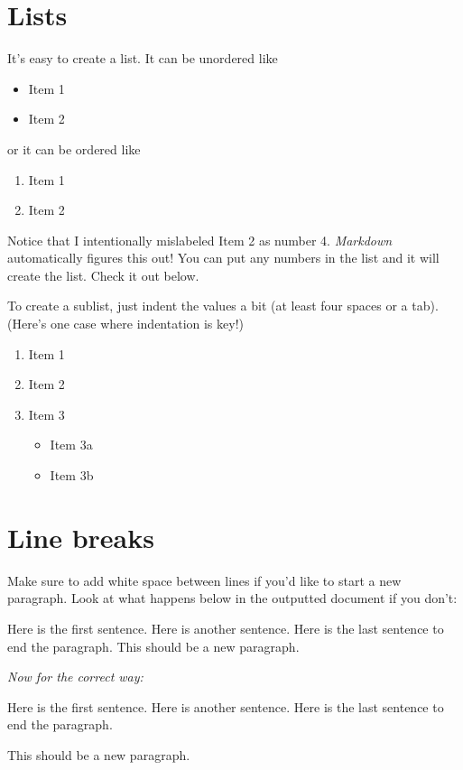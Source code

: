 \documentclass[12pt,twoside]{Mactemplate}
\providecommand{\tightlist}{%
  \setlength{\itemsep}{0pt}\setlength{\parskip}{0pt}}
\theoremstyle{definition}
\theoremstyle{definition}
\theoremstyle{definition}
\theoremstyle{remark}
\begin{document}
\section{Lists}\label{lists}

It's easy to create a list. It can be unordered like
\begin{itemize}
\tightlist
\item
  Item 1
\item
  Item 2
\end{itemize}
or it can be ordered like
\begin{enumerate}
\def\labelenumi{\arabic{enumi}.}
\tightlist
\item
  Item 1
\item
  Item 2
\end{enumerate}
Notice that I intentionally mislabeled Item 2 as number 4.
\emph{Markdown} automatically figures this out! You can put any numbers
in the list and it will create the list. Check it out below.

To create a sublist, just indent the values a bit (at least four spaces
or a tab). (Here's one case where indentation is key!)
\begin{enumerate}
\def\labelenumi{\arabic{enumi}.}
\tightlist
\item
  Item 1
\item
  Item 2
\item
  Item 3
  \begin{itemize}
  \tightlist
  \item
    Item 3a
  \item
    Item 3b
  \end{itemize}
\end{enumerate}
\section{Line breaks}\label{line-breaks}

Make sure to add white space between lines if you'd like to start a new
paragraph. Look at what happens below in the outputted document if you
don't:

Here is the first sentence. Here is another sentence. Here is the last
sentence to end the paragraph. This should be a new paragraph.

\emph{Now for the correct way:}

Here is the first sentence. Here is another sentence. Here is the last
sentence to end the paragraph.

This should be a new paragraph.
\end{document}
